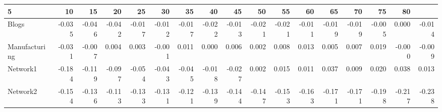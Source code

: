 \begin{tabular}{@{}lrrrrrrrrrrrrrrrr@{}}
\toprule

5 & 10 & 15 & 20 & 25 & 30 & 35 & 40 & 45 & 50 & 55 & 60 & 65 & 70 & 75 & 80 \\\midrule

Blogs & -0.035 & -0.046 & -0.042 & -0.017 & -0.012 & -0.017 & -0.022 & -0.013 & -0.021 & -0.021 & -0.011 & -0.019 & -0.019 & -0.005 & 0.000 & -0.014 \\
Manufacturing & -0.031 & -0.007 & 0.004 & 0.003 & -0.001 & 0.011 & 0.000 & 0.006 & 0.002 & 0.008 & 0.013 & 0.005 & 0.007 & 0.019 & -0.000 & -0.009 \\
Network1 & -0.184 & -0.119 & -0.097 & -0.054 & -0.043 & -0.045 & -0.018 & -0.027 & 0.002 & 0.015 & 0.011 & 0.037 & 0.009 & 0.020 & 0.038 & 0.013 \\
Network2 & -0.154 & -0.136 & -0.113 & -0.133 & -0.131 & -0.121 & -0.139 & -0.144 & -0.147 & -0.153 & -0.163 & -0.171 & -0.171 & -0.198 & -0.217 & -0.238 \\

\bottomrule
\end{tabular}
